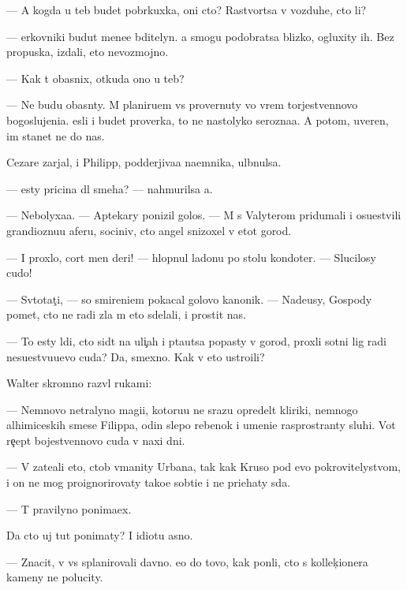 \documentclass[10pt]{book}
\begin{document}
— A kogda u teb{\ia} budet pobr{\ia}kuxka, oni cto? Rastvor{\ia}tsa v vozduhe, cto li?

— {\C}erkovniki budut mene{\y}e bditelyn{\yi}. {\Y}a smogu podobratsa blizko, ogluxity ih. Bez propuska, izdali, eto nevozmojno.

— Kak t{\yi} ob{\y}asnix, otkuda ono u teb{\ia}?

— Ne budu ob{\y}asn{\ia}ty. M{\yi} planiru{\y}em vs{\e} provernuty vo vrem{\ia} torjestvennovo bogoslujeni{\y}a. {\Y}esli i budet proverka, to ne nastolyko ser{\y}ozna{\y}a. A potom, uveren, im stanet ne do nas.

Cezare zarjal, i Philipp, podderjiva{\y}a na{\y}emnika, ul{\yi}bnulsa.

— {\Y}esty pricina dl{\ia} smeha? — nahmurilsa {\y}a.

— Nebolyxa{\y}a. — Aptekary ponizil golos. — M{\yi} s Valyterom pridumali i osu{\x}estvili grandioznu{\y}u aferu, sociniv, cto angel snizoxel v etot gorod.

— I proxlo, cort men{\ia} deri! — hlopnul ladon{\y}u po stolu kondot{\y}er. — Slucilosy cudo!

— Sv{\ia}totat{\c}i, — so smireni{\y}em pokacal golovo{\y} kanonik. — Nade{\y}usy, Gospody po{\y}met, cto ne radi zla m{\yi} eto sdelali, i prostit nas.

— To {\y}esty l{\iu}di, cto sid{\ia}t na uli{\c}ah i p{\yi}ta{\y}utsa popasty v gorod, proxli sotni lig radi nesu{\x}estvu{\y}u{\x}evo cuda? Da, smexno. Kak v{\yi} eto ustro{\y}ili?

Walter skromno razv{\e}l rukami:

— Nemnovo ne{\y}tralyno{\y} magi{\y}i, kotoru{\y}u ne srazu opredel{\ia}t kliriki, nemnogo alhimiceskih smese{\y} Filippa, odin slepo{\y} rebenok i umeni{\y}e rasprostran{\ia}ty sluhi. Vot re{\c}ept bojestvennovo cuda v naxi dni.

— V{\yi} zate{\y}ali eto, ctob{\yi} v{\yi}manity Urbana, tak kak Kruso pod {\y}evo pokrovitelystvom, i on ne mog proignorirovaty tako{\y}e sob{\yi}ti{\y}e i ne pri{\y}ehaty s{\iu}da.

— T{\yi} pravilyno ponima{\y}ex.

Da cto uj tut ponimaty? I idiotu {\y}asno.

— Znacit, v{\yi} vs{\e} splanirovali davno. {\y}e{\x}o do tovo, kak pon{\ia}li, cto s kollek{\c}ionera kameny ne polucity.
\end{document}
